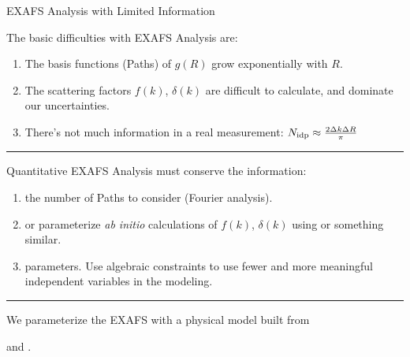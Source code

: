 \begin{slide}{EXAFS Analysis with Limited Information}
    
    The basic difficulties with EXAFS Analysis are:

    \begin{enumerate}
    \item The basis functions (Paths) of $g(R)$ grow exponentially with $R$.

    \item The scattering factors $f(k)$, $\delta(k)$ are difficult to
      calculate, and dominate our uncertainties.
      
    \item There's not much information in a real measurement:
      $  N_{\rm idp} \approx \frac{2\Delta k\Delta R}{\pi} $
      
    \end{enumerate}
    
    \hrule  \vmm \pause
    
    Quantitative EXAFS Analysis must conserve the information:
    
    \begin{enumerate}
     \item {} the number of Paths to consider
    (Fourier analysis). 

    \item {} or parameterize {\emph{ab initio}}
    calculations of $f(k)$, $\delta(k)$ using {\feff} or
    something similar. 
      
     \item {} parameters. Use algebraic constraints
    to use fewer and more meaningful independent variables in the modeling.
      
    \end{enumerate}

    \hrule \vmm \pause
   
    We parameterize the EXAFS with a physical model built from \par
    \vmm \hspace{40mm} {} and {}.
    
\vfill
\end{slide} 

